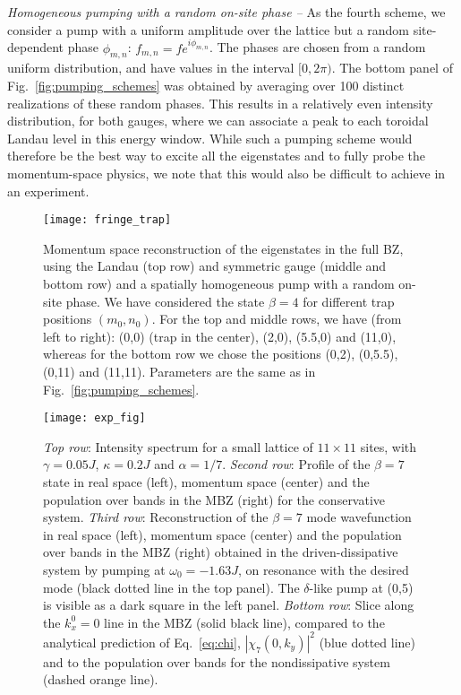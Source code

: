 {\em{Homogeneous pumping with a random on-site phase --}} As the
fourth scheme, we consider a pump with a uniform amplitude over the
lattice but a random site-dependent phase $\phi_{m,n}$:
$f_{m,n}=fe^{i\phi_{m,n}}$. The phases are chosen from a random
uniform distribution, and have values in the interval $[0,2\pi)$. The
bottom panel of Fig.~\ref{fig:pumping_schemes} was obtained by
averaging over 100 distinct realizations of these random phases. This
results in a relatively even intensity distribution, for both gauges,
where we can associate a peak to each toroidal Landau level in this
energy window. While such a pumping scheme would therefore be the best
way to excite all the eigenstates and to fully probe the
momentum-space physics, we note that this would also be difficult to
achieve in an experiment.
%
\begin{figure}[htb] \centering
  \texttt{[image: fringe\_trap]}
  \caption{Momentum space reconstruction of the eigenstates in the
full BZ, using the Landau (top row) and symmetric gauge (middle and
bottom row) and a spatially homogeneous pump with a random on-site
phase. We have considered the state $\beta = 4$ for different trap
positions $(m_0, n_0)$. For the top and middle rows, we have (from
left to right): (0,0) (trap in the center), (2,0), (5.5,0) and (11,0),
whereas for the bottom row we chose the positions (0,2), (0,5.5),
(0,11) and (11,11). Parameters are the same as in
Fig.~\ref{fig:pumping_schemes}.}
  \label{fig:moving_trap}
\end{figure}
%
\begin{figure}[htb] \centering
  \texttt{[image: exp\_fig]}
  \caption{\emph{Top row}: Intensity spectrum for a small lattice of
    $11 \times 11$ sites, with $\gamma = 0.05 J$, $\kappa = 0.2 J$ and
    $\alpha=1/7$.  \emph{Second row}: Profile of the $\beta=7$ state
    in real space (left), momentum space (center) and the population
    over bands in the MBZ (right) for the conservative system.
    \emph{Third row}: Reconstruction of the $\beta=7$ mode
    wavefunction in real space (left), momentum space (center) and the
    population over bands in the MBZ (right) obtained in the
    driven-dissipative system by pumping at $\omega_0 = -1.63 J$, on
    resonance with the desired mode (black dotted line in the top
    panel).  The $\delta$-like pump at (0,5) is visible as a dark
    square in the left panel.  \emph{Bottom row}: Slice along the
    $k_x^0 = 0$ line in the MBZ (solid black line), compared to the
    analytical prediction of Eq.~\eqref{eq:chi}, $|\chi_7(0,k_y)|^2$
    (blue dotted line) and to the population over bands for the
    nondissipative system (dashed orange line).}
  \label{fig:exp}
\end{figure}


